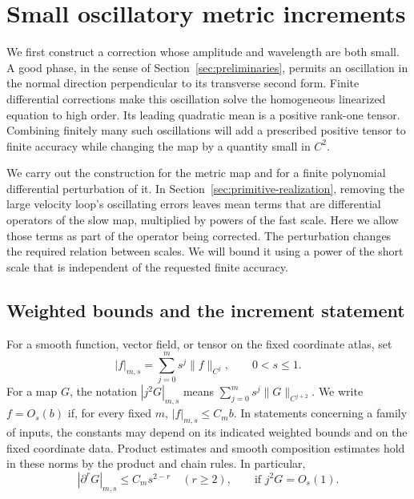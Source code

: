 \section{Small oscillatory metric increments}\label{sec:small-modes}

We first construct a correction whose amplitude and wavelength are both small.
A good phase, in the sense of Section~\ref{sec:preliminaries}, permits an
oscillation in the normal direction perpendicular to its transverse second
form.  Finite differential corrections make this oscillation solve the
homogeneous linearized equation to high order.  Its leading quadratic mean
is a positive rank-one tensor.  Combining finitely many such oscillations
will add a prescribed positive tensor to finite accuracy while changing
the map by a quantity small in $C^2$.

We carry out the construction for the metric map and for a finite
polynomial differential perturbation of it.  In
Section~\ref{sec:primitive-realization}, removing the large velocity loop's
oscillating errors leaves mean terms that are differential operators of
the slow map, multiplied by powers of the fast scale.  Here we allow
those terms as part of the operator being corrected.
The perturbation changes the required relation between scales.  We will
bound it using a power of the short scale that is independent of the
requested finite accuracy.

\subsection{Weighted bounds and the increment statement}

For a smooth function, vector field, or tensor on the fixed coordinate atlas,
set
\[
 |f|_{m,s}=\sum_{j=0}^m s^j\|f\|_{C^j},\qquad 0<s\leq1.
\]
For a map $G$, the notation $|j^2G|_{m,s}$ means
$\sum_{j=0}^m s^j\|G\|_{C^{j+2}}$. We write $f=O_s(b)$ if, for every fixed
$m$, $|f|_{m,s}\leq C_m b$. In statements concerning a family of inputs, the
constants may depend on its indicated weighted bounds and on the fixed
coordinate data. Product estimates and smooth composition estimates hold in
these norms by the product and chain rules. In particular,
\begin{equation}\label{eq:weighted-derivative}
 |\partial^rG|_{m,s}\leq C_m s^{2-r}
 \quad(r\geq2),\qquad\text{if }j^2G=O_s(1).
\end{equation}

